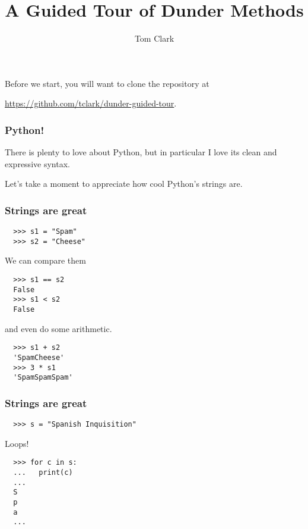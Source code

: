 \documentclass[aspectratio=169]{beamer}
\title{A Guided Tour of Dunder Methods}
\author{Tom Clark}
\date{}
\begin{document}
\begin{frame}[plain]
  \titlepage
  
  \centerline{Before we start, you will want to clone the repository at}
  \centerline{ \url{https://github.com/tclark/dunder-guided-tour}.}
\end{frame}

\begin{frame}
  \frametitle{Python!}
  
  There is plenty to love about Python, but in particular I love its clean and expressive syntax.
  \bigbreak
  
  Let's take a moment to appreciate how cool Python's strings are.
  
  
  \end{frame}

\begin{frame}[fragile]
  \frametitle{Strings are great}
  
  \begin{verbatim}
  >>> s1 = "Spam"
  >>> s2 = "Cheese"
  \end{verbatim}  
  We can compare them
  \begin{verbatim}
  >>> s1 == s2
  False
  >>> s1 < s2
  False
  \end{verbatim}  
  and even do some arithmetic.
  \begin{verbatim}
  >>> s1 + s2
  'SpamCheese'
  >>> 3 * s1
  'SpamSpamSpam'
  \end{verbatim}
  
  \end{frame}

\begin{frame}[fragile]
  \frametitle{Strings are great}
  
  \begin{verbatim}
  >>> s = "Spanish Inquisition"
  \end{verbatim}  
  Loops!
  \begin{verbatim}
  >>> for c in s:
  ...   print(c)
  ...
  S
  p
  a
  ...  
  \end{verbatim}
  
  \end{frame}
\end{document}
